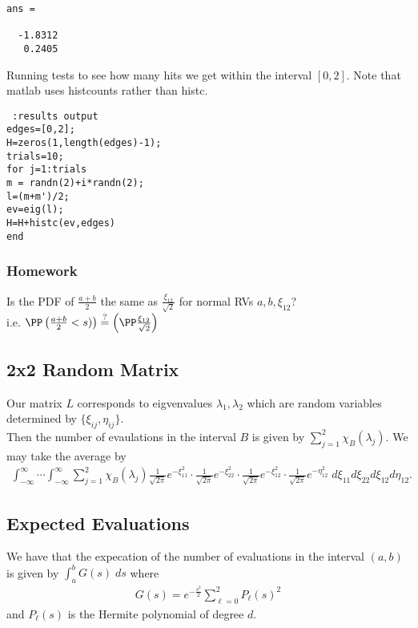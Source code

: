 \documentclass[11pt]{article}
\begin{document}
\label{}
\begin{verbatim}
ans =

  -1.8312
   0.2405
\end{verbatim}



Running tests to see how many hits we get within the interval \([0,2]\). Note that matlab uses histcounts rather than histc.\\
\begin{verbatim} :results output
edges=[0,2];
H=zeros(1,length(edges)-1);
trials=10;
for j=1:trials
m = randn(2)+i*randn(2);
l=(m+m')/2;
ev=eig(l);
H=H+histc(ev,edges)
end
\end{verbatim}
\subsubsection*{Homework}
\label{sec:org2460f8c}
Is the PDF of \(\frac{a+b}{2}\) the same as \(\frac{\xi_{12}}{\sqrt{2}}\) for normal RVs \(a,b,\xi_{12}\)?\\
i.e. \(\PP\left( \frac{a+b}{2}<s) \right)\overset{?}{=}\left( \PP\frac{\xi_{12}}{\sqrt{2}} \right)\)\\
\subsection*{2x2 Random Matrix}
\label{sec:org0e2dfe8}
Our matrix \(L\) corresponds to eigvenvalues \(\lambda_{1},\lambda_{2}\) which are random variables determined by \(\{\xi_{ij},\eta_{ij}\}\).\\
Then the number of evaulations in the interval \(B\) is given by \(\sum_{j=1}^{2}\chi_{B}(\lambda_{j})\). We may take the average by\\
\begin{align*}
  \int_{-\infty}^{\infty}\cdots\int_{-\infty}^{\infty}\sum_{j=1}^{2}\chi_{B}(\lambda_{j})\frac{1}{\sqrt{2\pi}}e^{-\xi^{2}_{11}}\cdot\frac{1}{\sqrt{2\pi}}e^{-\xi^{2}_{22}}\cdot\frac{1}{\sqrt{2\pi}}e^{-\xi^{2}_{12}}\cdot\frac{1}{\sqrt{2\pi}}e^{-\eta^{2}_{12}}\;d\xi_{11}d\xi_{22}d\xi_{12}d\eta_{12}.
\end{align*}
\subsection*{Expected Evaluations}
\label{sec:org9c7bb42}
We have that the expecation of the number of evaluations in the interval \((a,b)\) is given by \(\int_{a}^{b}G(s)\;ds\) where\\
\begin{align*}
  G(s)
  =e^{-\frac{s^{2}}{2}}\sum_{\ell=0}^{2}P_{\ell}(s)^{2}
\end{align*}
and \(P_{\ell}(s)\) is the Hermite polynomial of degree \(d\).\\
\end{document}
